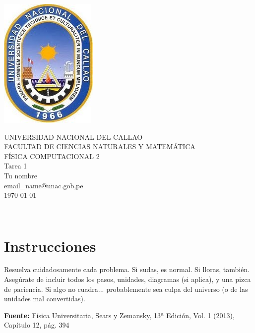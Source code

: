 \documentclass[10pt,a4paper]{article}
\makeatletter
\newcommand{\myUniversidad}{UNIVERSIDAD NACIONAL DEL CALLAO}
\newcommand{\myFacultad}{FACULTAD DE CIENCIAS NATURALES Y MATEM\'ATICA}
\newcommand{\myCurso}{F\'ISICA COMPUTACIONAL 2}
\newcommand{\myTarea }{Tarea }
\newcommand{\myNombre}{Tu nombre}
\newcommand{\myEmail}{email\_name@unac.gob,pe}
\newcommand{\myNumTarea}{1}
\makeatother
\begin{document}
\thispagestyle{plain} %
\begin{minipage}{.30\textwidth}
 \includegraphics[width=.5\textwidth]{Escudo_UNAC.png}\\[.5cm]
\end{minipage}
\begin{minipage}{.65\textwidth}
 \begin{center}  %
\Large{                
\myUniversidad\\
\myFacultad\\ 
\myCurso\\
{\myTarea \myNumTarea}\\
\myNombre\\
\myEmail\\
\today}
\end{center} 
\end{minipage}\\
\centerline{\underline{\hspace{7in}}}

\section*{Instrucciones}
Resuelva cuidadosamente cada problema. Si sudas, es normal. Si lloras, también. Asegúrate de incluir todos los pasos, unidades, diagramas (si aplica), y una pizca de paciencia. Si algo no cuadra... probablemente sea culpa del universo (o de las unidades mal convertidas).
\vspace{-1em}
\begin{center}
\textbf{Fuente:} Física Universitaria, Sears y Zemansky, 13ª Edición, Vol. 1 (2013), Capítulo 12, pág. 394
\end{center}
\end{document}
